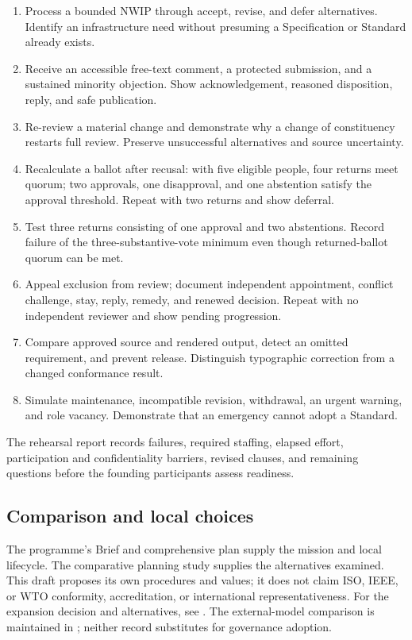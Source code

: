 \documentclass[11pt,a4paper]{article}
\begin{document}
\begin{enumerate}
\item Process a bounded NWIP through accept, revise, and defer alternatives. Identify an infrastructure need without presuming a Specification or Standard already exists.
\item Receive an accessible free-text comment, a protected submission, and a sustained minority objection. Show acknowledgement, reasoned disposition, reply, and safe publication.
\item Re-review a material change and demonstrate why a change of constituency restarts full review. Preserve unsuccessful alternatives and source uncertainty.
\item Recalculate a ballot after recusal: with five eligible people, four returns meet quorum; two approvals, one disapproval, and one abstention satisfy the approval threshold. Repeat with two returns and show deferral.
\item Test three returns consisting of one approval and two abstentions. Record failure of the three-substantive-vote minimum even though returned-ballot quorum can be met.
\item Appeal exclusion from review; document independent appointment, conflict challenge, stay, reply, remedy, and renewed decision. Repeat with no independent reviewer and show pending progression.
\item Compare approved source and rendered output, detect an omitted requirement, and prevent release. Distinguish typographic correction from a changed conformance result.
\item Simulate maintenance, incompatible revision, withdrawal, an urgent warning, and role vacancy. Demonstrate that an emergency cannot adopt a Standard.
\end{enumerate}
The rehearsal report records failures, required staffing, elapsed effort, participation and confidentiality barriers, revised clauses, and remaining questions before the founding participants assess readiness.

\subsection{Comparison and local choices}
The programme's Brief and comprehensive plan supply the mission and local lifecycle. The comparative planning study supplies the alternatives examined. This draft proposes its own procedures and values; it does not claim ISO, IEEE, or WTO conformity, accreditation, or international representativeness.
For the expansion decision and alternatives, see . The external-model comparison is maintained in ; neither record substitutes for governance adoption.
\end{document}

